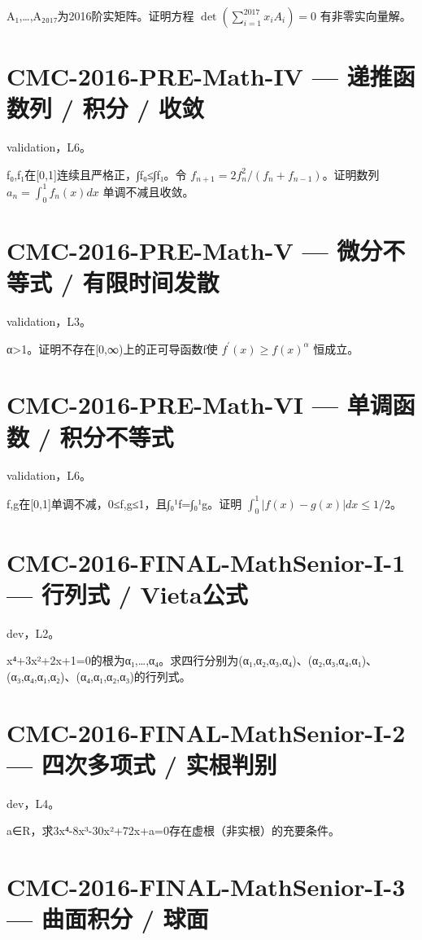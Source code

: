 \documentclass[UTF8]{ctexart}
\begin{document}
A₁,…,A₂₀₁₇为2016阶实矩阵。证明方程 $\det(\sum_{i=1}^{2017}x_iA_i)=0$ 有非零实向量解。

\section*{CMC-2016-PRE-Math-IV — 递推函数列 / 积分 / 收敛}

validation，L6。

f₀,f₁在[0,1]连续且严格正，∫f₀≤∫f₁。令 $f_{n+1}=2f_n^2/(f_n+f_{n-1})$。证明数列 $a_n=\int_0^1f_n(x)dx$ 单调不减且收敛。

\section*{CMC-2016-PRE-Math-V — 微分不等式 / 有限时间发散}

validation，L3。

α>1。证明不存在[0,∞)上的正可导函数f使 $f^{\prime}(x)\ge f(x)^\alpha$ 恒成立。

\section*{CMC-2016-PRE-Math-VI — 单调函数 / 积分不等式}

validation，L6。

f,g在[0,1]单调不减，0≤f,g≤1，且∫₀¹f=∫₀¹g。证明 $\int_0^1|f(x)-g(x)|dx\le1/2$。

\section*{CMC-2016-FINAL-MathSenior-I-1 — 行列式 / Vieta公式}

dev，L2。

x⁴+3x²+2x+1=0的根为α₁,…,α₄。求四行分别为(α₁,α₂,α₃,α₄)、(α₂,α₃,α₄,α₁)、(α₃,α₄,α₁,α₂)、(α₄,α₁,α₂,α₃)的行列式。

\section*{CMC-2016-FINAL-MathSenior-I-2 — 四次多项式 / 实根判别}

dev，L4。

a∈R，求3x⁴-8x³-30x²+72x+a=0存在虚根（非实根）的充要条件。

\section*{CMC-2016-FINAL-MathSenior-I-3 — 曲面积分 / 球面}
\end{document}
